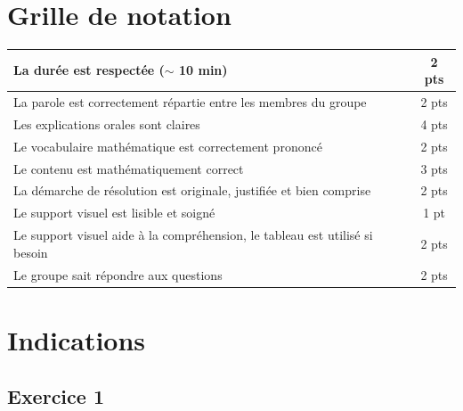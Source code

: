 \documentclass[a4paper,12pt, noSujetB]{article}
\begin{document}
        \section*{Grille de notation}
\begin{center}
\begin{tabular}{ | l | c | }
\hline
La durée est respectée ($\sim$ 10 min) & 2 pts\\
\hline
La parole est correctement répartie entre les membres du groupe & 2 pts\\
\hline
Les explications orales sont claires & 4 pts\\
\hline
Le vocabulaire mathématique est correctement prononcé & 2 pts\\
\hline
Le contenu est mathématiquement correct & 3 pts\\
\hline
La démarche de résolution est originale, justifiée et bien comprise & 2 pts\\
\hline
Le support visuel est lisible et soigné & 1 pt\\
\hline
Le support visuel aide à la compréhension, le tableau est utilisé si besoin & 2 pts\\
\hline
Le groupe sait répondre aux questions & 2 pts\\
\hline
\end{tabular}
\end{center}

\newpage
\section*{Indications}
\subsection*{Exercice 1}
\end{document}
